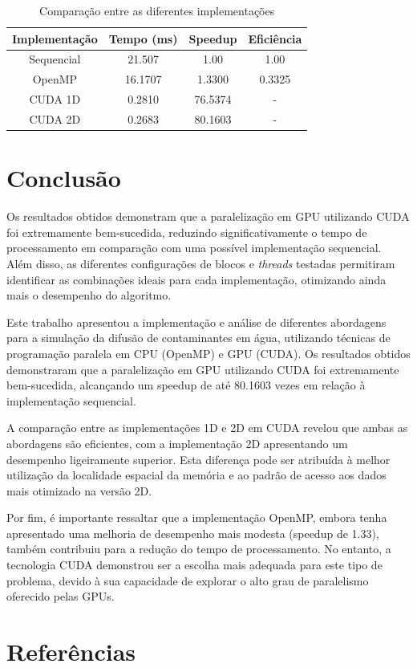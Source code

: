 \documentclass[12pt]{article}
\begin{document}
\begin{table}[ht]
    \centering
    \caption{Comparação entre as diferentes implementações}
    \begin{tabular}{|c|c|c|c|}
        \hline
        \textbf{Implementação} & \textbf{Tempo (ms)} & \textbf{Speedup} & \textbf{Eficiência} \\
        \hline
        Sequencial & 21.507 & 1.00 & 1.00 \\
        \hline
        OpenMP & 16.1707 & 1.3300 & 0.3325 \\
        \hline
        CUDA 1D & 0.2810 & 76.5374 & - \\
        \hline
        CUDA 2D & 0.2683 & 80.1603 & - \\
        \hline
    \end{tabular}
    \label{tab:comparacao_implementacoes}
\end{table}

\section{Conclusão} \label{sec:conclusao}
Os resultados obtidos demonstram que a paralelização em GPU utilizando CUDA foi extremamente bem-sucedida, reduzindo significativamente o tempo de processamento em comparação com uma possível implementação sequencial. Além disso, as diferentes configurações de blocos e \emph{threads} testadas permitiram identificar as combinações ideais para cada implementação, otimizando ainda mais o desempenho do algoritmo.

Este trabalho apresentou a implementação e análise de diferentes abordagens para a simulação da difusão de contaminantes em água, utilizando técnicas de programação paralela em CPU (OpenMP) e GPU (CUDA). Os resultados obtidos demonstraram que a paralelização em GPU utilizando CUDA foi extremamente bem-sucedida, alcançando um speedup de até 80.1603 vezes em relação à implementação sequencial.

A comparação entre as implementações 1D e 2D em CUDA revelou que ambas as abordagens são eficientes, com a implementação 2D apresentando um desempenho ligeiramente superior. Esta diferença pode ser atribuída à melhor utilização da localidade espacial da memória e ao padrão de acesso aos dados mais otimizado na versão 2D.

Por fim, é importante ressaltar que a implementação OpenMP, embora tenha apresentado uma melhoria de desempenho mais modesta (speedup de 1.33), também contribuiu para a redução do tempo de processamento. No entanto, a tecnologia CUDA demonstrou ser a escolha mais adequada para este tipo de problema, devido à sua capacidade de explorar o alto grau de paralelismo oferecido pelas GPUs.


\section{Referências} \label{sec:referencias}


\end{document}
